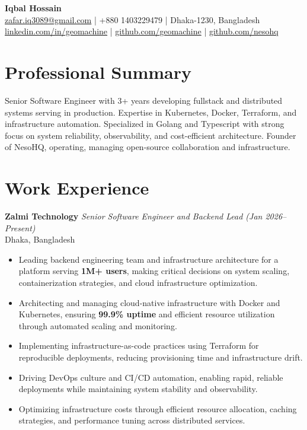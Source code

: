 \documentclass[11pt,a4paper]{article}
\begin{document}
\begin{center}
    {\LARGE \textbf{Iqbal Hossain}}\\
    \vspace{2mm}
    \href{mailto:zafar.iq3089@gmail.com}{zafar.iq3089@gmail.com} | +880 1403229479 | Dhaka-1230, Bangladesh\\
    \href{https://linkedin.com/in/geomachine}{linkedin.com/in/geomachine} | \href{https://github.com/geomachine}{github.com/geomachine} | \href{https://github.com/nesohq}{github.com/nesohq}
\end{center}

\section*{Professional Summary}
Senior Software Engineer with 3+ years developing fullstack and distributed systems serving in production. Expertise in Kubernetes, Docker, Terraform, and infrastructure automation. Specialized in Golang and Typescript with strong focus on system reliability, observability, and cost-efficient architecture. Founder of NesoHQ, operating, managing open-source collaboration and infrastructure.

\section*{Work Experience}
\textbf{Zalmi Technology} \hfill \textit{Senior Software Engineer and Backend Lead (Jan 2026--Present)} \\
Dhaka, Bangladesh
\begin{itemize}[leftmargin=*,noitemsep]
    \item Leading backend engineering team and infrastructure architecture for a platform serving \textbf{1M+ users}, making critical decisions on system scaling, containerization strategies, and cloud infrastructure optimization.
    \item Architecting and managing cloud-native infrastructure with Docker and Kubernetes, ensuring \textbf{99.9\% uptime} and efficient resource utilization through automated scaling and monitoring.
    \item Implementing infrastructure-as-code practices using Terraform for reproducible deployments, reducing provisioning time and infrastructure drift.
    \item Driving DevOps culture and CI/CD automation, enabling rapid, reliable deployments while maintaining system stability and observability.
    \item Optimizing infrastructure costs through efficient resource allocation, caching strategies, and performance tuning across distributed services.
\end{itemize}
\end{document}
